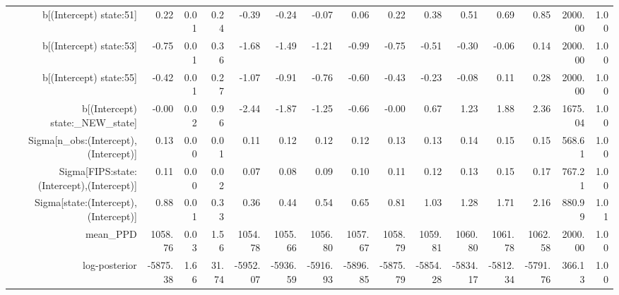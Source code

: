 \begin{table}[ht]
\begin{tabular}{rrrrrrrrrrrrrrr}
  b[(Intercept) state:51] & 0.22 & 0.01 & 0.24 & -0.39 & -0.24 & -0.07 & 0.06 & 0.22 & 0.38 & 0.51 & 0.69 & 0.85 & 2000.00 & 1.00 \\ 
  b[(Intercept) state:53] & -0.75 & 0.01 & 0.36 & -1.68 & -1.49 & -1.21 & -0.99 & -0.75 & -0.51 & -0.30 & -0.06 & 0.14 & 2000.00 & 1.00 \\ 
  b[(Intercept) state:55] & -0.42 & 0.01 & 0.27 & -1.07 & -0.91 & -0.76 & -0.60 & -0.43 & -0.23 & -0.08 & 0.11 & 0.28 & 2000.00 & 1.00 \\ 
  b[(Intercept) state:\_NEW\_state] & -0.00 & 0.02 & 0.96 & -2.44 & -1.87 & -1.25 & -0.66 & -0.00 & 0.67 & 1.23 & 1.88 & 2.36 & 1675.04 & 1.00 \\ 
  Sigma[n\_obs:(Intercept),(Intercept)] & 0.13 & 0.00 & 0.01 & 0.11 & 0.12 & 0.12 & 0.12 & 0.13 & 0.13 & 0.14 & 0.15 & 0.15 & 568.61 & 1.00 \\ 
  Sigma[FIPS:state:(Intercept),(Intercept)] & 0.11 & 0.00 & 0.02 & 0.07 & 0.08 & 0.09 & 0.10 & 0.11 & 0.12 & 0.13 & 0.15 & 0.17 & 767.21 & 1.00 \\ 
  Sigma[state:(Intercept),(Intercept)] & 0.88 & 0.01 & 0.33 & 0.36 & 0.44 & 0.54 & 0.65 & 0.81 & 1.03 & 1.28 & 1.71 & 2.16 & 880.99 & 1.01 \\ 
  mean\_PPD & 1058.76 & 0.03 & 1.56 & 1054.78 & 1055.66 & 1056.80 & 1057.67 & 1058.79 & 1059.81 & 1060.80 & 1061.78 & 1062.58 & 2000.00 & 1.00 \\ 
  log-posterior & -5875.38 & 1.66 & 31.74 & -5952.07 & -5936.59 & -5916.93 & -5896.85 & -5875.79 & -5854.28 & -5834.17 & -5812.34 & -5791.76 & 366.13 & 1.00 \\ 
   \hline
\end{tabular}
\end{table}
